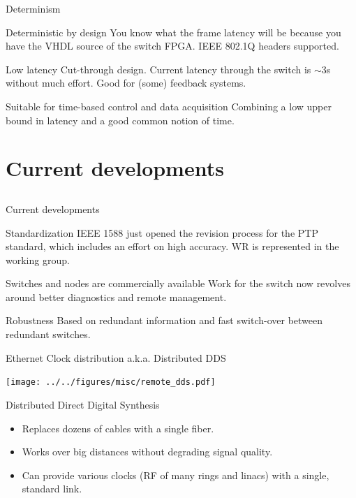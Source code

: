 \documentclass[compress, red]{beamer}
\begin{document}
\begin{frame}{Determinism}
\pause
 \begin{block}{Deterministic by design}
  You know what the frame latency will be because you have the VHDL
  source of the switch FPGA. IEEE 802.1Q headers supported.
 \end{block}
\pause
 \begin{block}{Low latency}
  Cut-through design. Current latency through the switch is
  $\sim$3\textmu s without much effort. Good for (some) feedback systems.
 \end{block}
\pause 
 \begin{block}{Suitable for time-based control and data acquisition}
  Combining a low upper bound in latency and a good common notion of time. 
 \end{block}

\end{frame}

\section{Current developments}
\subsection{}

\begin{frame}{Current developments}
\pause
 \begin{block}{Standardization}
  IEEE 1588 just opened the revision process for the PTP standard,
  which includes an effort on high accuracy. WR is represented in the
  working group.
 \end{block}
\pause
 \begin{block}{Switches and nodes are commercially available}
  Work for the switch now revolves around better diagnostics and
  remote management.
 \end{block}
\pause
 \begin{block}{Robustness}
  Based on redundant information and fast switch-over between
  redundant switches. 
 \end{block}
\end{frame}

\begin{frame}{Ethernet Clock distribution a.k.a. Distributed DDS}
  \begin{center}
    \texttt{[image: ../../figures/misc/remote\_dds.pdf]}
  \end{center}
  \begin{block}{Distributed Direct Digital Synthesis}
    \begin{itemize}
    \item Replaces dozens of cables with a single fiber.
    \item Works over big distances without degrading signal quality.
    \item Can provide various clocks (RF of many rings and linacs)
      with a single, standard link.
    \end{itemize}
  \end{block}
\end{frame}
\end{document}
